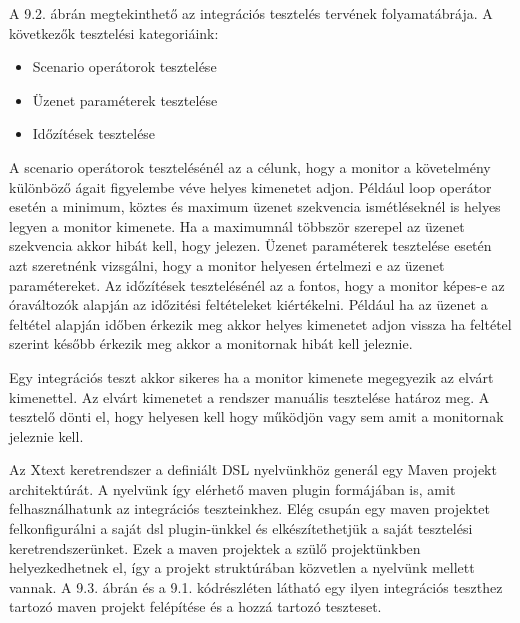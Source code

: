 A 9.2. ábrán megtekinthető az integrációs tesztelés tervének folyamatábrája.
A következők tesztelési kategoriáink:

\begin{itemize}
    \item Scenario operátorok tesztelése
    \item Üzenet paraméterek tesztelése
    \item Időzítések tesztelése
\end{itemize}

A scenario operátorok tesztelésénél az a célunk, hogy a monitor a követelmény különböző ágait figyelembe véve helyes kimenetet adjon.
Például loop operátor esetén a minimum, köztes és maximum üzenet szekvencia ismétléseknél is helyes legyen a monitor kimenete.
Ha a maximumnál többször szerepel az üzenet szekvencia akkor hibát kell, hogy jelezen.
Üzenet paraméterek tesztelése esetén azt szeretnénk vizsgálni, hogy a monitor helyesen értelmezi e az üzenet paramétereket.
Az időzítések tesztelésénél az a fontos, hogy a monitor képes-e az óraváltozók alapján az időzitési feltételeket kiértékelni.
Például ha az üzenet a feltétel alapján időben érkezik meg akkor helyes kimenetet adjon vissza ha feltétel szerint később érkezik meg akkor a monitornak hibát kell jeleznie.

Egy integrációs teszt akkor sikeres ha a monitor kimenete megegyezik az elvárt kimenettel.
Az elvárt kimenetet a rendszer manuális tesztelése határoz meg.
A tesztelő dönti el, hogy helyesen kell hogy működjön vagy sem amit a monitornak jeleznie kell.

\clearpage

Az Xtext keretrendszer a definiált DSL nyelvünkhöz generál egy Maven projekt architektúrát.
A nyelvünk így elérhető maven plugin formájában is, amit felhasználhatunk az integrációs teszteinkhez.
Elég csupán egy maven projektet felkonfigurálni a saját dsl plugin-ünkkel és elkészítethetjük a saját tesztelési keretrendszerünket.
Ezek a maven projektek a szülő projektünkben helyezkedhetnek el, így a projekt struktúrában közvetlen a nyelvünk mellett vannak.
A 9.3. ábrán és a 9.1. kódrészléten látható egy ilyen integrációs teszthez tartozó maven projekt felépítése és a hozzá tartozó teszteset.

